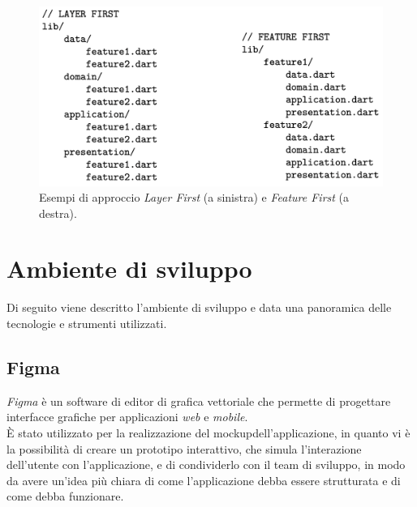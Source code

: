 \begin{figure}[!h] 
    \centering 
    \includegraphics[width=0.8\columnwidth]{images/project_structures.png} 
    \caption{Esempi di approccio \emph{Layer First} (a sinistra) e \emph{Feature First} (a destra).}
    \label{fig:project-structures}
\end{figure}




\section{Ambiente di sviluppo}
\label{sec:ambiente-sviluppo}
Di seguito viene descritto l'ambiente di sviluppo e data una panoramica delle tecnologie e strumenti utilizzati.

\subsection*{Figma}
\label{subsec:figma}

\emph{Figma} \cite{site:figma} è un software di editor di grafica vettoriale che permette di progettare interfacce grafiche per applicazioni \emph{web} e \emph{mobile}.\\
È stato utilizzato per la realizzazione del \gls{mockup}\glsoccur dell'applicazione, in quanto vi è la possibilità di creare un prototipo interattivo, che simula l'interazione dell'utente con l'applicazione, e di condividerlo con il team di sviluppo, in modo da avere un'idea più chiara di come l'applicazione debba essere strutturata e di come debba funzionare.

